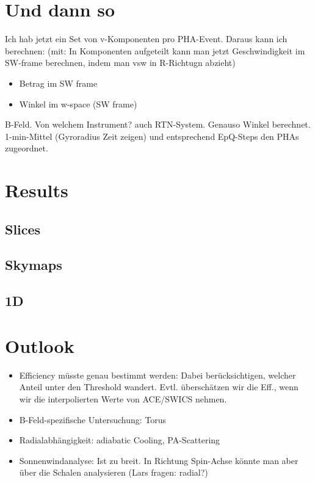 %
%
%
\section{Und dann so}
Ich hab jetzt ein Set von v-Komponenten pro PHA-Event. Daraus kann ich berechnen:
(mit: In Komponenten aufgeteilt kann man jetzt Geschwindigkeit im SW-frame berechnen, indem man vsw in R-Richtugn abzieht)
\begin{itemize}
	\item Betrag im SW frame
	\item Winkel im w-space (SW frame)
\end{itemize}
B-Feld. Von welchem Instrument? auch RTN-System. Genauso Winkel berechnet.\\
1-min-Mittel (Gyroradius Zeit zeigen) und entsprechend EpQ-Steps den PHAs zugeordnet.


%
%
%
\section{Results}
\subsection{Slices}
\subsection{Skymaps}
\subsection{1D}



%
%
%
\section{Outlook}
\begin{itemize}
	\item Efficiency müsste genau bestimmt werden: Dabei berücksichtigen, welcher Anteil unter den Threshold wandert. Evtl. überschätzen wir die Eff., wenn wir die interpolierten Werte von ACE/SWICS nehmen.
	\item B-Feld-spezifische Untersuchung: Torus
	\item Radialabhängigkeit: adiabatic Cooling, PA-Scattering
	\item Sonnenwindanalyse: Ist zu breit. In Richtung Spin-Achse könnte man aber über die Schalen analysieren (Lars fragen: radial?)

\end{itemize}







